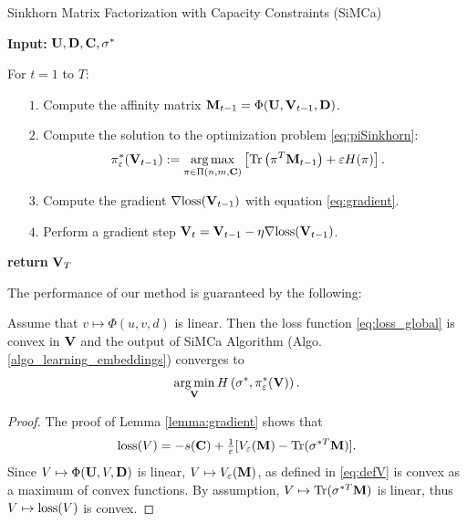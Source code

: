 \begin{algorithm}[h]
\caption{\label{algo_learning_embeddings} Sinkhorn Matrix Factorization with Capacity Constraints (SiMCa)}
\begin{flushleft}
    \textbf{Input:} $\mathbf{U}, \mathbf{D}, \mathbf{C}, \sigma^*$

    For $t =1$ to $T$:

    \begin{itemize}
    	\item[$1.$] Compute the affinity matrix $\mathbf{M}_{t-1} = \Phi(\mathbf{U},\mathbf{V}_{t-1},\mathbf{D})$.

    	\item[$2.$]  Compute the solution to the optimization problem \eqref{eq:piSinkhorn}:
    	\begin{equation*}
    	\pi_{\varepsilon}^*(\mathbf{V}_{t-1}) := \operatorname*{arg\,max}_{\pi \in \Pi(n,m,\mathbf{C})} \left[{\rm Tr}\left( \pi^T \mathbf{M}_{t-1} \right) + \varepsilon H(\pi) \right].
    	\end{equation*}

    	\item[$3.$]  Compute the gradient $\nabla \mathrm{loss}(\mathbf{V}_{t-1})$ with equation \eqref{eq:gradient}.

    	\item[$4.$]  Perform a gradient step $\mathbf{V}_{t} = \mathbf{V}_{t-1} - \eta \nabla \mathrm{loss}(\mathbf{V}_{t-1})$.
    \end{itemize}
\textbf{return} $\mathbf{V}_T$
\end{flushleft}
\end{algorithm}

The performance of our method is guaranteed by the following:
\begin{lemma}\label{lemma:convergence_guarantee}
Assume that $v \mapsto \Phi(u,v,d)$ is linear. Then the loss function \eqref{eq:loss_global} is convex in $\mathbf{V}$ and the output of SiMCa Algorithm (Algo. \ref{algo_learning_embeddings}) converges to
\begin{equation*}
    \operatorname*{arg\,min}_{\mathbf{V}} H\left(\sigma^*,\pi^*_{\varepsilon}(\mathbf{V})\right).
\end{equation*}
\end{lemma}

\begin{proof}
The proof of Lemma \ref{lemma:gradient} shows that
\begin{equation*}
    \mathrm{loss}(V) = -s(\mathbf{C}) + \tfrac{1}{\varepsilon} [
          V_\varepsilon(\mathbf{M}) - {\rm Tr}(\sigma^{*T}\mathbf{M})].
\end{equation*}
Since $V \mapsto \Phi(\mathbf{U},V,\mathbf{D})$ is linear, $V \mapsto V_\varepsilon(\mathbf{M})$, as defined in \eqref{eq:defV} is convex as a maximum of convex functions. By assumption, $V \mapsto {\rm Tr}(\sigma^{*T}\mathbf{M})$ is linear, thus $V \mapsto \mathrm{loss}(V)$ is convex.
\end{proof}

